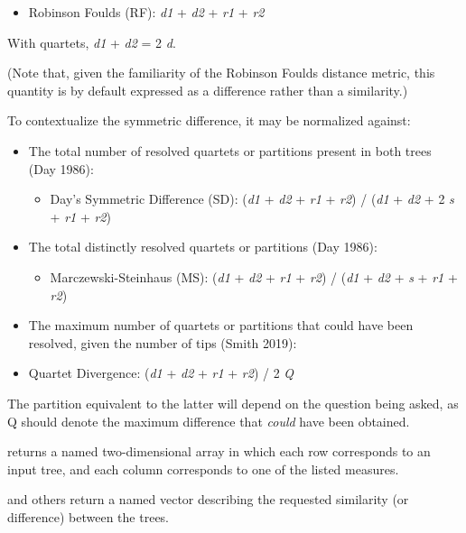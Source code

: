 \documentclass[a4paper]{book}
\begin{document}
\begin{Details}
\begin{itemize}
\item Robinson Foulds (RF): \emph{d1} + \emph{d2} + \emph{r1} + \emph{r2}

\end{itemize}


With quartets, \emph{d1} + \emph{d2} = 2 \emph{d}.

(Note that, given the familiarity of the Robinson Foulds distance metric, this
quantity is by default expressed as a difference rather than a similarity.)

To contextualize the symmetric difference, it may be normalized against:
\begin{itemize}

\item The total number of resolved quartets or partitions present in both trees (Day 1986):
\begin{itemize}

\item Day's Symmetric Difference (SD): (\emph{d1} + \emph{d2} + \emph{r1} + \emph{r2}) /
(\emph{d1} + \emph{d2} + 2 \emph{s} + \emph{r1} + \emph{r2})

\end{itemize}

\item The total distinctly resolved quartets or partitions (Day 1986):
\begin{itemize}

\item Marczewski-Steinhaus (MS): (\emph{d1} + \emph{d2} + \emph{r1} + \emph{r2}) /
(\emph{d1} + \emph{d2} + \emph{s} + \emph{r1} + \emph{r2})

\end{itemize}

\item The maximum number of quartets or partitions that could have been resolved, given the
number of tips (Smith 2019):
\item Quartet Divergence: (\emph{d1} + \emph{d2} + \emph{r1} + \emph{r2}) / 2 \emph{Q}

\end{itemize}


The partition equivalent to the latter will depend on the question being
asked, as Q should denote the maximum difference that \emph{could} have been
obtained.
\end{Details}
%
\begin{Value}
 returns a named two-dimensional array in which each row
corresponds to an input tree, and each column corresponds to one of the
listed measures.

 and others return a named vector describing the requested
similarity (or difference) between the trees.
\end{Value}
\end{document}
